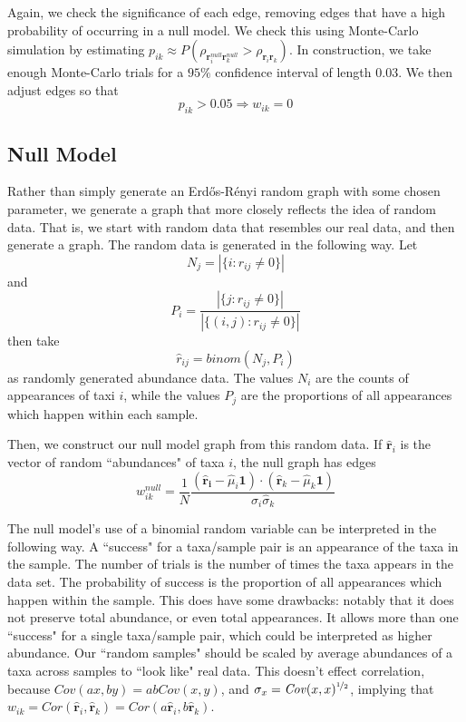 \documentclass[10pt]{article}
\theoremstyle{definition}
\numberwithin{theorem}{section}
\numberwithin{definition}{section}
\numberwithin{lemma}{section}
\numberwithin{corollary}{section}
\numberwithin{clm}{section}
\numberwithin{rmk}{section}
\newcommand{\nhalf}{\nicefrac{1}{2}}
\renewcommand{\b}{\bm}
\begin{document}
Again, we check the significance of each edge, removing edges that have a high probability of occurring in a null model. We check this using Monte-Carlo simulation by estimating $p_{ik} \approx P(\rho_{\b{r}_i^{null}\b{r}_k^{null}} > \rho_{\b{r}_i\b{r}_k})$. In construction, we take enough Monte-Carlo trials for a $95\%$ confidence interval of length $0.03$. We then adjust edges so that
\[
p_{ik} > 0.05 \Rightarrow w_{ik} = 0
\]

\subsection{Null Model}\label{null}
Rather than simply generate an Erd\H{o}s-R\'{e}nyi random graph with some chosen parameter, we generate a graph that more closely reflects the idea of random data. That is, we start with random data that resembles our real data, and then generate a graph. The random data is generated in the following way. Let 
\[
N_j = |\{i: r_{ij} \neq 0\}|
\]
and 
\[
P_i = \frac{|\{j: r_{ij}\neq 0 \}|}{|\{(i,j): r_{ij}\neq 0 \}|}
\]
then take 
\[
\hat{r}_{ij} = \mathit{binom}(N_j,P_i)
\]
as randomly generated abundance data. The values $N_i$ are the counts of appearances of taxi $i$, while the values $P_j$ are the proportions of all appearances which happen within each sample. 
		
Then, we construct our null model graph from this random data. If $\hat{\b{r}}_i$ is the vector of random ``abundances" of taxa $i$, the null graph has edges
\[
w_{ik}^{null} = \frac{1}{N}\frac{(\b{\hat{\b{r}}_i}- \hat{\mu}_i\b{1}) \cdot (\hat{\b{r}}_k - \hat{\mu}_k\b{1})}{\hat{\sigma}_i \hat{\sigma}_k}
\]

The null model's use of a binomial random variable can be interpreted in the following way. A ``success" for a taxa/sample pair is an appearance of the taxa in the sample. The number of trials is the number of times the taxa appears in the data set. The probability of success is the proportion of all appearances which happen within the sample. This does have some drawbacks: notably that it does not preserve total abundance, or even total appearances. It allows more than one ``success" for a single taxa/sample pair, which could be interpreted as higher abundance. Our ``random samples" should be scaled by average abundances of a taxa across samples to ``look like" real data. This doesn't effect correlation, because $\mathit{Cov}(ax,by) = ab\mathit{Cov}(x,y)$, and $\sigma_x = \mathit{Cov}(x,x)^{\nhalf}$, implying that $w_{ik} = \mathit{Cor}(\hat{\b{r}}_i,\hat{\b{r}}_k) =  \mathit{Cor}(a\hat{\b{r}}_i,b\hat{\b{r}}_k)$. 
\end{document}
